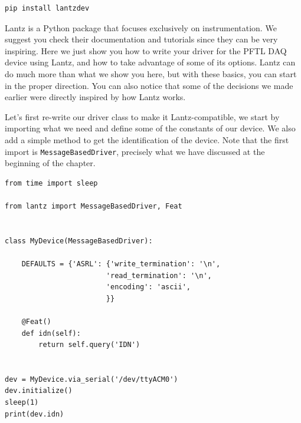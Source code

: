 \begin{verbatim}
pip install lantzdev
\end{verbatim}


Lantz is a Python package that focuses exclusively on instrumentation. We suggest you check their documentation and tutorials since they can be very inspiring. Here we just show you how to write your driver for the {PFTL DAQ} device using Lantz, and how to take advantage of some of its options. Lantz can do much more than what we show you here, but with these basics, you can start in the proper direction. You can also notice that some of the decisions we made earlier were directly inspired by how Lantz works.

Let's first re-write our driver class to make it Lantz-compatible, we start by importing what we need and define some of the constants of our device. We also add a simple method to get the identification of the device. Note that the first import is \texttt{MessageBasedDriver}, precisely what we have discussed at the beginning of the chapter.

\begin{verbatim}
from time import sleep

from lantz import MessageBasedDriver, Feat


class MyDevice(MessageBasedDriver):

    DEFAULTS = {'ASRL': {'write_termination': '\n',
                        'read_termination': '\n',
                        'encoding': 'ascii',
                        }}

    @Feat()
    def idn(self):
        return self.query('IDN')


dev = MyDevice.via_serial('/dev/ttyACM0')
dev.initialize()
sleep(1)
print(dev.idn)
\end{verbatim}

